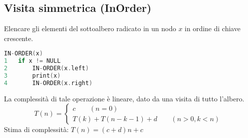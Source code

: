 \subsection{Visita simmetrica (InOrder)}
Elencare gli elementi del sottoalbero radicato in un nodo $x$ in ordine di chiave crescente.
\begin{mdframed}
\begin{lstlisting}[language=C]
IN-ORDER(x)
1   if x != NULL
2       IN-ORDER(x.left)
3       print(x)
4       IN-ORDER(x.right)
\end{lstlisting}
\end{mdframed}
La complessità di tale operazione è lineare, dato da una visita di tutto l'albero.
\begin{equation*}
    T(n) = \begin{cases}
        c \qquad(n=0)\\
        T(k) + T(n-k-1) + d \qquad(n>0, k<n)
    \end{cases}
\end{equation*}
Stima di complessità: $T(n) = (c+d)n + c$
